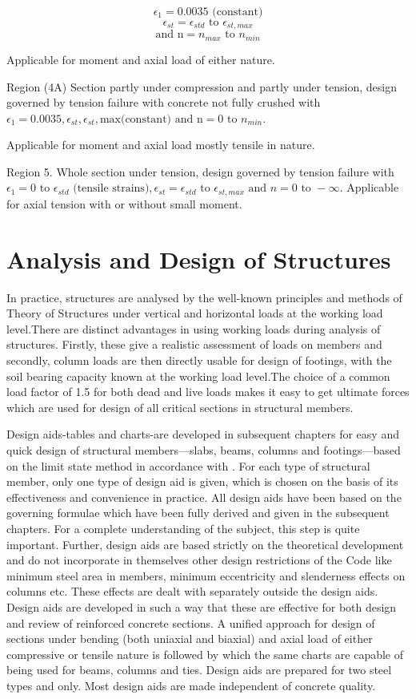 $$\epsilon_1 = 0.0035 \text{ (constant)}$$
$$\epsilon_{st} = \epsilon_{std} \text{ to } \epsilon_{st,max}$$
$$\text{and n} = n_{max} \text{ to } n_{min}$$

Applicable for moment and axial load of either nature.

Region (4A) Section partly under compression and partly under tension,
design governed by tension failure with concrete not fully crushed with
$\epsilon_1 = 0.0035,\epsilon_{st},\epsilon_{st},
\text{max(constant) and n} = 0 \text{ to } n_{min}.$

Applicable for moment and axial load mostly tensile in nature.

Region 5. Whole section under tension, design governed by tension failure with 
$\epsilon_1 = 0 \text{ to }\epsilon_{std} \text{ (tensile strains)},
\epsilon_{st}=\epsilon_{std} \text{ to } \epsilon_{st,max} \text{ and } n =
0 \text{ to } -\infty.$
Applicable for axial tension with or without small moment.

\section{Analysis and Design of Structures}

In practice, structures are analysed by the well-known principles and
methods of Theory of Structures under vertical and horizontal loads at the
working load level.There are distinct advantages in using working loads
during analysis of structures. Firstly, these give a realistic assessment
of loads on members and secondly, column loads are then directly usable
for design of footings, with the soil bearing capacity known at the working
load level.The choice of a common load factor of 1.5 for both dead and
live loads makes it easy to get ultimate forces which are used for
design of all critical sections in structural members.


Design aids-tables and charts-are developed in subsequent  chapters for
easy and quick design of structural members—slabs, beams, columns and
footings—based on the limit state method in accordance with
. For each type of structural member, only
one type of design aid is given, which is chosen on the basis of its
effectiveness and convenience in practice. All design aids have been 
based on the governing formulae which have been fully derived and given
in the subsequent chapters. For a complete understanding of the subject,
this step is quite important. Further, design aids are based strictly
on the theoretical development and do not incorporate in themselves other
design restrictions of the Code like minimum steel area in members, minimum
eccentricity and slenderness effects on columns etc. These effects are
dealt with separately outside the design aids. Design aids are developed
in such a way that these are effective for both design and review of
reinforced concrete sections. A unified approach for design of sections
under bending (both uniaxial and biaxial) and axial load of either
compressive or tensile nature is followed by which the same charts are
capable of being used for beams, columns and ties. Design aids are
prepared for two steel types {\fetwofivezero}  and {\fefouronefive} only.
Most design aids are made independent of concrete quality.

